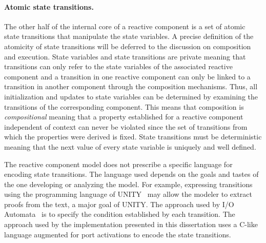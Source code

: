 \paragraph{Atomic state transitions.}
The other half of the internal core of a reactive component is a set of atomic state transitions that manipulate the state variables.
A precise definition of the atomicity of state transitions will be deferred to the discussion on composition and execution.
State variables and state transitions are private meaning that transitions can only refer to the state variables of the associated reactive component and a transition in one reactive component can only be linked to a transition in another component through the composition mechanisms.
Thus, all initialization and updates to state variables can be determined by examining the transitions of the corresponding component.
This means that composition is \emph{compositional} meaning that a property established for a reactive component independent of context can never be violated since the set of transitions from which the properties were derived is fixed.
State transitions must be deterministic meaning that the next value of every state variable is uniquely and well defined.

The reactive component model does not prescribe a specific language for encoding state transitions.
The language used depends on the goals and tastes of the one developing or analyzing the model.
For example, expressing transitions using the programming language of UNITY~\cite{chandy1989parallel} may allow the modeler to extract proofs from the text, a major goal of UNITY.
The approach used by I/O Automata~\cite{nancy1996distributed} is to specify the condition established by each transition.
The approach used by the implementation presented in this dissertation uses a C-like language augmented for port activations to encode the state transitions.


